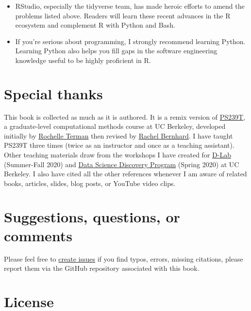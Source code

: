 \documentclass[
]{book}
\begin{document}
\begin{itemize}
  \begin{itemize}
  \item
    RStudio, especially the tidyverse team, has made heroic efforts to amend the problems listed above. Readers will learn these recent advances in the R ecosystem and complement R with Python and Bash.
  \item
    If you're serious about programming, I strongly recommend learning Python. Learning Python also helps you fill gaps in the software engineering knowledge useful to be highly proficient in R.
  \end{itemize}
\end{itemize}

\hypertarget{special-thanks}{%
\section{Special thanks}\label{special-thanks}}

This book is collected as much as it is authored. It is a remix version of \href{https://github.com/rochelleterman/PS239T}{PS239T}, a graduate-level computational methods course at UC Berkeley, developed initially by \href{http://rochelleterman.com/}{Rochelle Terman} then revised by \href{http://rachelbernhard.com/}{Rachel Bernhard}. I have taught PS239T three times (twice as an instructor and once as a teaching assistant). Other teaching materials draw from the workshops I have created for \href{https://dlab.berkeley.edu/}{D-Lab} (Summer-Fall 2020) and \href{https://data.berkeley.edu/research/discovery-program-home}{Data Science Discovery Program} (Spring 2020) at UC Berkeley. I also have cited all the other references whenever I am aware of related books, articles, slides, blog posts, or YouTube video clips.

\hypertarget{suggestions-questions-or-comments}{%
\section{Suggestions, questions, or comments}\label{suggestions-questions-or-comments}}

Please feel free to \href{https://github.com/jaeyk/PS239T/issues}{create issues} if you find typos, errors, missing citations, please report them via the GitHub repository associated with this book.

\hypertarget{license}{%
\section{License}\label{license}}
\end{document}

